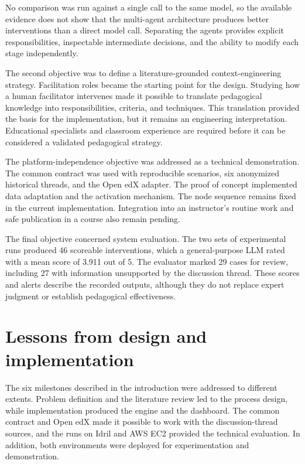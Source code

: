 No comparison was run against a single call to the same model, so the available evidence does not show that the multi-agent architecture produces better interventions than a direct model call. Separating the agents provides explicit responsibilities, inspectable intermediate decisions, and the ability to modify each stage independently.

The second objective was to define a literature-grounded context-engineering strategy. Facilitation roles became the starting point for the design. Studying how a human facilitator intervenes made it possible to translate pedagogical knowledge into responsibilities, criteria, and techniques. This translation provided the basis for the implementation, but it remains an engineering interpretation. Educational specialists and classroom experience are required before it can be considered a validated pedagogical strategy.

The platform-independence objective was addressed as a technical demonstration. The common contract was used with reproducible scenarios, six anonymized historical threads, and the Open edX adapter. The proof of concept implemented data adaptation and the activation mechanism. The node sequence remains fixed in the current implementation. Integration into an instructor's routine work and safe publication in a course also remain pending.

The final objective concerned system evaluation. The two sets of experimental runs produced 46 scoreable interventions, which a general-purpose LLM rated with a mean score of 3.911 out of 5. The evaluator marked 29 cases for review, including 27 with information unsupported by the discussion thread. These scores and alerts describe the recorded outputs, although they do not replace expert judgment or establish pedagogical effectiveness.

\section{Lessons from design and implementation}

The six milestones described in the introduction were addressed to different extents. Problem definition and the literature review led to the process design, while implementation produced the engine and the dashboard. The common contract and Open edX made it possible to work with the discussion-thread sources, and the runs on Idril and AWS EC2 provided the technical evaluation. In addition, both environments were deployed for experimentation and demonstration.

